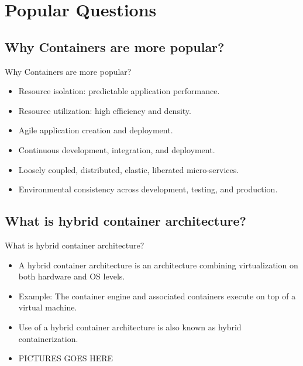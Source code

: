 

\section{Popular Questions}\label{sec:popular-questions}

\subsection{Why Containers are more popular?}\label{subsec:containers-are-more-popular}
\begin{frame}{Why Containers are more popular?}
    \begin{itemize}
        \item Resource isolation: predictable application performance.
        \item Resource utilization: high efficiency and density.
        \item Agile application creation and deployment.
        \item Continuous development, integration, and deployment.
        \item Loosely coupled, distributed, elastic, liberated micro-services.
        \item Environmental consistency across development, testing, and production.
    \end{itemize}
\end{frame}

\subsection{What is hybrid container architecture?}\label{subsec:hybrid-container-architecture?}
\begin{frame}{What is hybrid container architecture?}
    \begin{itemize}
        \item A hybrid container architecture is an architecture combining virtualization on both hardware and OS levels.
        \item Example: The container engine and associated containers execute on top of a virtual machine.
        \item Use of a hybrid container architecture is also known as hybrid containerization.
        \item PICTURES GOES HERE
    \end{itemize}
\end{frame}


